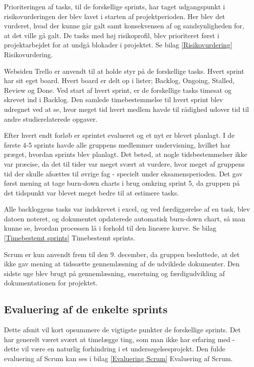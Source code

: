 Prioriteringen af tasks, til de forskellige sprints, har taget udgangspunkt i risikovurderingen der blev lavet i starten af projektperioden. Her blev det vurderet, hvad der kunne går galt samt konsekvensen af og sandsynligheden for, at det ville gå galt. De tasks med høj risikoprofil, blev prioriteret først i projektarbejdet for at undgå blokader i projektet. Se bilag \ref{Risikovurdering} Risikovurdering.  

Websiden Trello er anvendt til at holde styr på de forskellige tasks. Hvert sprint har sit eget board. Hvert board er delt op i lister; Backlog, Ongoing, Stalled, Review og Done. Ved start af hvert sprint, er de forskellige tasks timesat og skrevet ind i Backlog. Den samlede timebestemmelse til hvert sprint blev udregnet ved at se, hvor meget tid hvert medlem havde til rådighed udover tid til andre studierelaterede opgaver. 

Efter hvert endt forløb er sprintet evalueret og et nyt er blevet planlagt. I de første 4-5 sprints havde alle gruppens medlemmer undervisning, hvilket har præget, hvordan sprints blev planlagt. Det betød, at nogle tidsbestemmelser ikke var præcise, da det til tider var meget svært at vurdere, hvor meget af gruppens tid der skulle afsættes til øvrige fag - specielt under eksamensperioden. Det gav først mening at tage burn-down charts i brug omkring sprint 5, da gruppen på det tidspunkt var blevet meget bedre til at estimere tasks.

Alle backloggens tasks var indskrevet i excel, og ved færdiggørelse af en task, blev datoen noteret, og dokumentet opdaterede automatisk burn-down chart, så man kunne se, hvordan processen lå i forhold til den lineære kurve. Se bilag \ref{Timebestemt sprints} Timebestemt sprints. 

Scrum er kun anvendt frem til den 9. december, da gruppen besluttede, at det ikke gav mening at tidssætte gennemlæsning af de udviklede dokumenter. Den sidste uge blev brugt på gennemlæsning, ensretning og færdigudvikling af dokumentationen for projektet.  

\subsection{Evaluering af de enkelte sprints} 
Dette afsnit vil kort opsummere de vigtigste punkter de forskellige sprints. Det har generelt været svært at timelægge ting, som man ikke har erfaring med - dette vil være en naturlig forhindring i et undersøgelsesprojekt. Den fulde evaluering af Scrum kan ses i bilag \ref{Evaluering Scrum} Evaluering af Scrum.

